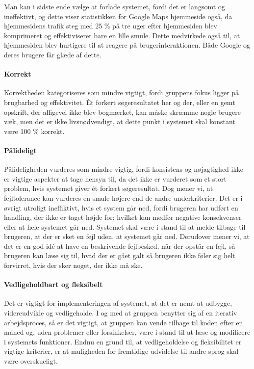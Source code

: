 Man kan i sidste ende vælge at forlade systemet, fordi det er langsomt og ineffektivt, og dette viser statistikken for Google Maps hjemmeside også, da hjemmesidens trafik steg med 25 \% på tre uger efter hjemmesiden blev komprimeret og effektiviseret bare en lille smule. Dette medvirkede også til, at hjemmesiden blev hurtigere til at reagere på brugerinteraktionen. Både Google og deres brugere får glæde af dette.

\paragraph{Korrekt} Korrektheden kategoriseres som mindre vigtigt, fordi gruppens fokus ligger på brugbarhed og effektivitet. Èt forkert søgeresultatet her og der, eller en gemt opskrift, der alligevel ikke blev bogmærket, kan måske skræmme nogle brugere væk, men det er ikke livsnødvendigt, at dette punkt i systemet skal konstant være 100 \% korrekt.

\paragraph{Pålideligt} Pålideligheden vurderes som mindre vigtig, fordi konsistens og nøjagtighed ikke er vigtige aspekter at tage hensyn til, da det ikke er vurderet som et stort problem, hvis systemet giver ét forkert søgeresultat. Dog mener vi, at fejltolerance kan vurderes en smule højere end de andre underkriterier. Det er i øvrigt utroligt ineffiktivt, hvis et system går ned, fordi brugeren har udført en handling, der ikke er taget højde for; hvilket kan medfør negative konsekvenser eller at hele systemet går ned. Systemet skal være i stand til at melde tilbage til brugeren, at der er sket en fejl uden, at systemet går ned. Derudover mener vi, at det er en god idé at have en beskrivende fejlbesked, når der opstår en fejl, så brugeren kan læse sig til, hvad der er gået galt så brugeren ikke føler sig helt forvirret, hvis der sker noget, der ikke må ske.

\paragraph{Vedligeholdbart og fleksibelt} Det er vigtigt for implementeringen af systemet, at det er nemt at udbygge, videreudvikle og vedligeholde. I og med at gruppen benytter sig af en iterativ arbejdsproces, så er det vigtigt, at gruppen kan vende tilbage til koden efter \fx en måned og, uden problemer eller forsinkelser, være i stand til at læse og modificere i systemets funktioner. Endnu en grund til, at vedligeholdelse og fleksibilitet er vigtige kriterier, er at muligheden for fremtidige udvidelse til \fx andre sprog skal være overskueligt.

